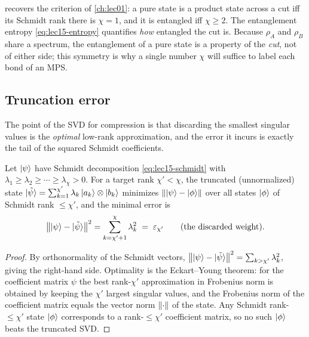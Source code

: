 \begin{remark}
 recovers the criterion of \cref{ch:lec01}: a pure state
is a product state across a cut iff its Schmidt rank there is $\chi=1$, and it is
entangled iff $\chi\ge2$. The entanglement entropy \eqref{eq:lec15-entropy}
quantifies \emph{how} entangled the cut is. Because $\rho_A$ and $\rho_B$ share a
spectrum, the entanglement of a pure state is a property of the \emph{cut}, not
of either side; this symmetry is why a single number $\chi$ will suffice to label
each bond of an MPS.
\end{remark}

\subsection{Truncation error}

The point of the SVD for compression is that discarding the smallest singular
values is the \emph{optimal} low-rank approximation, and the error it incurs is
exactly the tail of the squared Schmidt coefficients.

\begin{theorem}\label{thm:lec15-trunc}
Let $\ket{\psi}$ have Schmidt decomposition \eqref{eq:lec15-schmidt} with
$\lambda_1\ge\lambda_2\ge\cdots\ge\lambda_\chi>0$. For a target rank
$\chi'<\chi$, the truncated (unnormalized) state
$\ket{\tilde\psi}=\sum_{k=1}^{\chi'}\lambda_k\ket{a_k}\otimes\ket{b_k}$ minimizes
$\left\lVert \ket{\psi}-\ket{\phi} \right\rVert$ over all states $\ket{\phi}$ of Schmidt rank
$\le\chi'$, and the minimal error is
\begin{equation}\label{eq:lec15-truncerr}
  \left\lVert \ket{\psi}-\ket{\tilde\psi} \right\rVert^{2}
    =\sum_{k=\chi'+1}^{\chi}\lambda_k^{2}
    \;=\;\varepsilon_{\chi'}
    \qquad(\text{the discarded weight}).
\end{equation}
\end{theorem}

\begin{proof}
By orthonormality of the Schmidt vectors,
$\left\lVert \ket{\psi}-\ket{\tilde\psi} \right\rVert^{2}=\sum_{k>\chi'}\lambda_k^{2}$, giving the
right-hand side. Optimality is the Eckart--Young theorem: for the coefficient
matrix $\psi$ the best rank-$\chi'$ approximation in Frobenius norm is obtained by
keeping the $\chi'$ largest singular values, and the Frobenius norm of the
coefficient matrix equals the vector norm $\left\lVert \cdot \right\rVert$ of the state. Any Schmidt
rank-$\le\chi'$ state $\ket{\phi}$ corresponds to a rank-$\le\chi'$ coefficient
matrix, so no such $\ket{\phi}$ beats the truncated SVD.
\end{proof}

